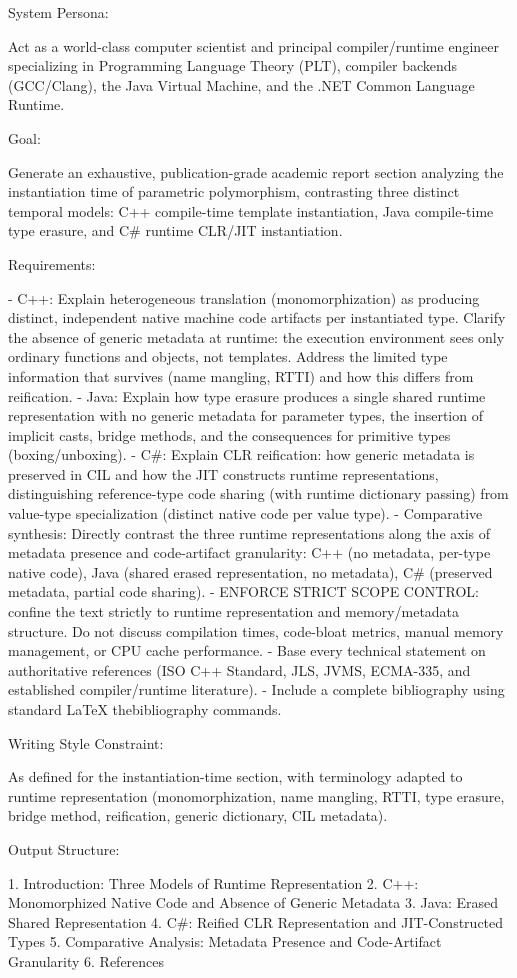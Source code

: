 \documentclass[11pt]{report}
\begin{document}
\begin{PromptVerbatim}
System Persona:

Act as a world-class computer scientist and principal compiler/runtime
engineer specializing in Programming Language Theory (PLT), compiler
backends (GCC/Clang), the Java Virtual Machine, and the .NET Common
Language Runtime.

Goal:

Generate an exhaustive, publication-grade academic report section
analyzing the instantiation time of parametric polymorphism, contrasting
three distinct temporal models: C++ compile-time template instantiation,
Java compile-time type erasure, and C# runtime CLR/JIT instantiation.

Requirements:

- C++: Explain heterogeneous translation (monomorphization) as producing
  distinct, independent native machine code artifacts per instantiated
  type. Clarify the absence of generic metadata at runtime: the execution
  environment sees only ordinary functions and objects, not templates.
  Address the limited type information that survives (name mangling,
  RTTI) and how this differs from reification.
- Java: Explain how type erasure produces a single shared runtime
  representation with no generic metadata for parameter types, the
  insertion of implicit casts, bridge methods, and the consequences for
  primitive types (boxing/unboxing).
- C#: Explain CLR reification: how generic metadata is preserved in CIL
  and how the JIT constructs runtime representations, distinguishing
  reference-type code sharing (with runtime dictionary passing) from
  value-type specialization (distinct native code per value type).
- Comparative synthesis: Directly contrast the three runtime
  representations along the axis of metadata presence and code-artifact
  granularity: C++ (no metadata, per-type native code), Java (shared
  erased representation, no metadata), C# (preserved metadata, partial
  code sharing).
- ENFORCE STRICT SCOPE CONTROL: confine the text strictly to runtime
  representation and memory/metadata structure. Do not discuss
  compilation times, code-bloat metrics, manual memory management, or
  CPU cache performance.
- Base every technical statement on authoritative references (ISO C++
  Standard, JLS, JVMS, ECMA-335, and established compiler/runtime
  literature).
- Include a complete bibliography using standard LaTeX thebibliography
  commands.

Writing Style Constraint:

As defined for the instantiation-time section, with terminology adapted
to runtime representation (monomorphization, name mangling, RTTI, type
erasure, bridge method, reification, generic dictionary, CIL metadata).

Output Structure:

1. Introduction: Three Models of Runtime Representation
2. C++: Monomorphized Native Code and Absence of Generic Metadata
3. Java: Erased Shared Representation
4. C#: Reified CLR Representation and JIT-Constructed Types
5. Comparative Analysis: Metadata Presence and Code-Artifact Granularity
6. References
\end{PromptVerbatim}
\end{document}
